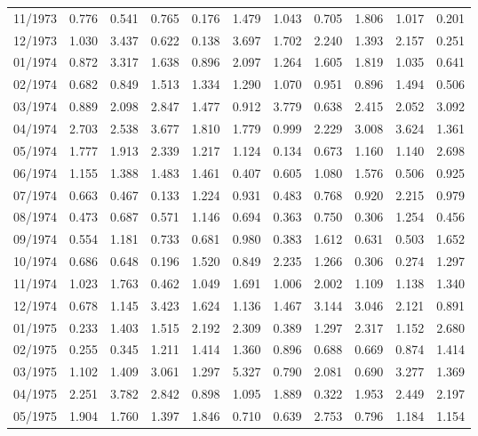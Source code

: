 \begin{tabular}{lrrrrrrrrrr}
11/1973 &  0.776 &  0.541 &  0.765 &  0.176 &  1.479 &  1.043 &  0.705 &  1.806 &  1.017 &  0.201 \\
12/1973 &  1.030 &  3.437 &  0.622 &  0.138 &  3.697 &  1.702 &  2.240 &  1.393 &  2.157 &  0.251 \\
01/1974 &  0.872 &  3.317 &  1.638 &  0.896 &  2.097 &  1.264 &  1.605 &  1.819 &  1.035 &  0.641 \\
02/1974 &  0.682 &  0.849 &  1.513 &  1.334 &  1.290 &  1.070 &  0.951 &  0.896 &  1.494 &  0.506 \\
03/1974 &  0.889 &  2.098 &  2.847 &  1.477 &  0.912 &  3.779 &  0.638 &  2.415 &  2.052 &  3.092 \\
04/1974 &  2.703 &  2.538 &  3.677 &  1.810 &  1.779 &  0.999 &  2.229 &  3.008 &  3.624 &  1.361 \\
05/1974 &  1.777 &  1.913 &  2.339 &  1.217 &  1.124 &  0.134 &  0.673 &  1.160 &  1.140 &  2.698 \\
06/1974 &  1.155 &  1.388 &  1.483 &  1.461 &  0.407 &  0.605 &  1.080 &  1.576 &  0.506 &  0.925 \\
07/1974 &  0.663 &  0.467 &  0.133 &  1.224 &  0.931 &  0.483 &  0.768 &  0.920 &  2.215 &  0.979 \\
08/1974 &  0.473 &  0.687 &  0.571 &  1.146 &  0.694 &  0.363 &  0.750 &  0.306 &  1.254 &  0.456 \\
09/1974 &  0.554 &  1.181 &  0.733 &  0.681 &  0.980 &  0.383 &  1.612 &  0.631 &  0.503 &  1.652 \\
10/1974 &  0.686 &  0.648 &  0.196 &  1.520 &  0.849 &  2.235 &  1.266 &  0.306 &  0.274 &  1.297 \\
11/1974 &  1.023 &  1.763 &  0.462 &  1.049 &  1.691 &  1.006 &  2.002 &  1.109 &  1.138 &  1.340 \\
12/1974 &  0.678 &  1.145 &  3.423 &  1.624 &  1.136 &  1.467 &  3.144 &  3.046 &  2.121 &  0.891 \\
01/1975 &  0.233 &  1.403 &  1.515 &  2.192 &  2.309 &  0.389 &  1.297 &  2.317 &  1.152 &  2.680 \\
02/1975 &  0.255 &  0.345 &  1.211 &  1.414 &  1.360 &  0.896 &  0.688 &  0.669 &  0.874 &  1.414 \\
03/1975 &  1.102 &  1.409 &  3.061 &  1.297 &  5.327 &  0.790 &  2.081 &  0.690 &  3.277 &  1.369 \\
04/1975 &  2.251 &  3.782 &  2.842 &  0.898 &  1.095 &  1.889 &  0.322 &  1.953 &  2.449 &  2.197 \\
05/1975 &  1.904 &  1.760 &  1.397 &  1.846 &  0.710 &  0.639 &  2.753 &  0.796 &  1.184 &  1.154 \\

\end{tabular}

